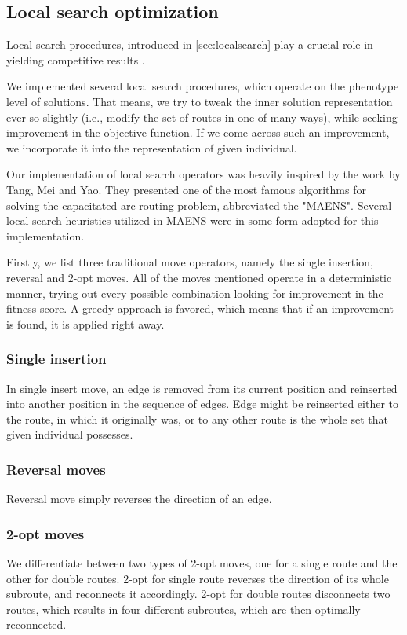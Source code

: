 \documentclass[twoside]{ctuthesis}
\theoremstyle{plain}
\theoremstyle{definition}
\theoremstyle{note}
\begin{document}
\subsection{Local search optimization}
\label{sec:localsearchcarp}
Local search procedures, introduced in \ref{sec:localsearch} play a crucial role in yielding competitive results \cite{marte2018handbook}.

We implemented several local search procedures, which operate on the phenotype level of solutions. That means, we try to tweak the inner solution representation ever so slightly (i.e., modify the set of routes in one of many ways), while seeking improvement in the objective function. If we come across such an improvement, we incorporate it into the representation of given individual.

Our implementation of local search operators was heavily inspired by the work \cite{tang2009memetic} by Tang, Mei and Yao. They presented one of the most famous algorithms for solving the capacitated arc routing problem, abbreviated the "MAENS". Several local search heuristics utilized in MAENS were in some form adopted for this implementation.

Firstly, we list three traditional move operators, namely the single insertion, reversal and 2-opt moves. All of the moves mentioned operate in a deterministic manner, trying out every possible combination looking for improvement in the fitness score. A greedy approach is favored, which means that if an improvement is found, it is applied right away.

\subsubsection{Single insertion}
In single insert move, an edge is removed from its current position and reinserted into another position in the sequence of edges. Edge might be reinserted either to the route, in which it originally was, or to any other route is the whole set that given individual possesses.

\subsubsection{Reversal moves}
Reversal move simply reverses the direction of an edge. 

\subsubsection{2-opt moves}
We differentiate between two types of 2-opt moves, one for a single route and the other for double routes.
2-opt for single route reverses the direction of its whole subroute, and reconnects it accordingly.
2-opt for double routes disconnects two routes, which results in four different subroutes, which are then optimally reconnected.
\end{document}
